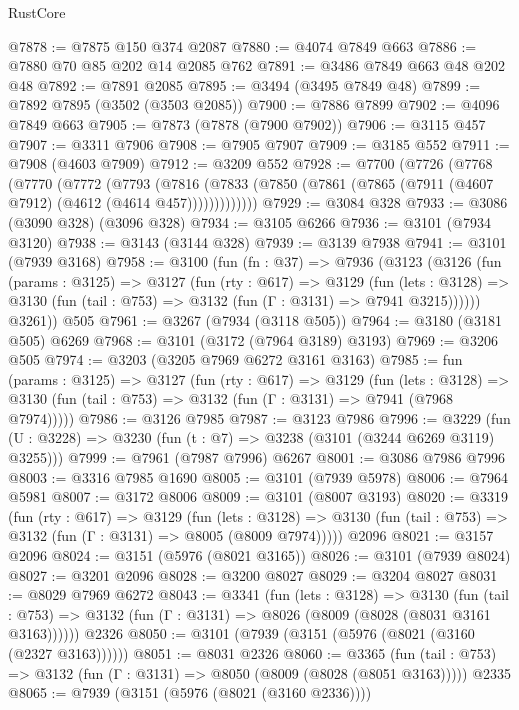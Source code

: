 \begin{lexlean}{RustCore}
\begin{coremodule}
@7878 := @7875 @150 @374 @2087
@7880 := @4074 @7849 @663
@7886 := @7880 @70 @85 @202 @14 @2085 @762
@7891 := @3486 @7849 @663 @48 @202 @48
@7892 := @7891 @2085
@7895 := @3494 (@3495 @7849 @48)
@7899 := @7892 @7895 (@3502 (@3503 @2085))
@7900 := @7886 @7899
@7902 := @4096 @7849 @663
@7905 := @7873 (@7878 (@7900 @7902))
@7906 := @3115 @457
@7907 := @3311 @7906
@7908 := @7905 @7907
@7909 := @3185 @552
@7911 := @7908 (@4603 @7909)
@7912 := @3209 @552
@7928 := @7700
    (@7726
      (@7768
        (@7770
          (@7772
            (@7793
              (@7816
                (@7833 (@7850 (@7861 (@7865 (@7911 (@4607 @7912) (@4612 (@4614 @457)))))))))))))
@7929 := @3084 @328
@7933 := @3086 (@3090 @328) (@3096 @328)
@7934 := @3105 @6266
@7936 := @3101 (@7934 @3120)
@7938 := @3143 (@3144 @328)
@7939 := @3139 @7938
@7941 := @3101 (@7939 @3168)
@7958 := @3100
    (fun (fn : @37) =>
    @7936
      (@3123
        (@3126
          (fun (params : @3125) =>
          @3127
            (fun (rty : @617) =>
            @3129
              (fun (lets : @3128) =>
              @3130 (fun (tail : @753) => @3132 (fun (Γ : @3131) => @7941 @3215))))))
        @3261))
    @505
@7961 := @3267 (@7934 (@3118 @505))
@7964 := @3180 (@3181 @505) @6269
@7968 := @3101 (@3172 (@7964 @3189) @3193)
@7969 := @3206 @505
@7974 := @3203 (@3205 @7969 @6272 @3161 @3163)
@7985 := fun (params : @3125) =>
  @3127
    (fun (rty : @617) =>
    @3129
      (fun (lets : @3128) =>
      @3130 (fun (tail : @753) => @3132 (fun (Γ : @3131) => @7941 (@7968 @7974)))))
@7986 := @3126 @7985
@7987 := @3123 @7986
@7996 := @3229 (fun (U : @3228) => @3230 (fun (t : @7) => @3238 (@3101 (@3244 @6269 @3119) @3255)))
@7999 := @7961 (@7987 @7996) @6267
@8001 := @3086 @7986 @7996
@8003 := @3316 @7985 @1690
@8005 := @3101 (@7939 @5978)
@8006 := @7964 @5981
@8007 := @3172 @8006
@8009 := @3101 (@8007 @3193)
@8020 := @3319
    (fun (rty : @617) =>
    @3129
      (fun (lets : @3128) =>
      @3130 (fun (tail : @753) => @3132 (fun (Γ : @3131) => @8005 (@8009 @7974)))))
    @2096
@8021 := @3157 @2096
@8024 := @3151 (@5976 (@8021 @3165))
@8026 := @3101 (@7939 @8024)
@8027 := @3201 @2096
@8028 := @3200 @8027
@8029 := @3204 @8027
@8031 := @8029 @7969 @6272
@8043 := @3341
    (fun (lets : @3128) =>
    @3130
      (fun (tail : @753) => @3132 (fun (Γ : @3131) => @8026 (@8009 (@8028 (@8031 @3161 @3163))))))
    @2326
@8050 := @3101 (@7939 (@3151 (@5976 (@8021 (@3160 (@2327 @3163))))))
@8051 := @8031 @2326
@8060 := @3365
    (fun (tail : @753) => @3132 (fun (Γ : @3131) => @8050 (@8009 (@8028 (@8051 @3163)))))
    @2335
@8065 := @7939 (@3151 (@5976 (@8021 (@3160 @2336))))

\end{coremodule}
\end{lexlean}
